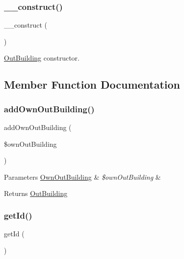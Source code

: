 \subsubsection{\texorpdfstring{\_\_construct()}{\_\_construct()}}
{\footnotesize\ttfamily \+\_\+\+\_\+construct (\begin{DoxyParamCaption}{ }\end{DoxyParamCaption})}

\mbox{\hyperlink{class_app_1_1_entity_1_1_out_building}{Out\+Building}} constructor. 

\subsection{Member Function Documentation}
\mbox{\label{class_app_1_1_entity_1_1_out_building_a494be730fc915817fdc2643ccae26715}} 
\subsubsection{\texorpdfstring{addOwnOutBuilding()}{addOwnOutBuilding()}}
{\footnotesize\ttfamily add\+Own\+Out\+Building (\begin{DoxyParamCaption}\item[{\mbox{\hyperlink{class_app_1_1_entity_1_1_own_out_building}{Own\+Out\+Building}}}]{\$own\+Out\+Building }\end{DoxyParamCaption})}


\begin{DoxyParams}[1]{Parameters}
\mbox{\hyperlink{class_app_1_1_entity_1_1_own_out_building}{Own\+Out\+Building}} & {\em \$own\+Out\+Building} & \\
\hline
\end{DoxyParams}
\begin{DoxyReturn}{Returns}
\mbox{\hyperlink{class_app_1_1_entity_1_1_out_building}{Out\+Building}} 
\end{DoxyReturn}
\mbox{\label{class_app_1_1_entity_1_1_out_building_a12251d0c022e9e21c137a105ff683f13}} 
\subsubsection{\texorpdfstring{getId()}{getId()}}
{\footnotesize\ttfamily get\+Id (\begin{DoxyParamCaption}{ }\end{DoxyParamCaption})}

